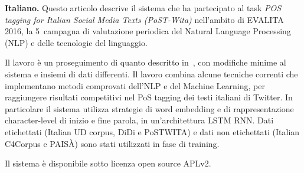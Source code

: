 \documentclass[11pt]{article}
\title{\mytitle}
\author{Egon W.~Stemle \\
    Institute for Specialised Communication and Multilingualism \\
    EURAC Research \\
    Bolzano/Bozen, Italy
    {\tt egon.stemle@eurac.edu}}
\date{}
\begin{document}
\maketitle

\begin{abstract} %
\textbf{English.}  
This article describes the system that participated in the \emph{POS tagging
for Italian Social Media Texts} (PoSTWITA) task of the 5\textsuperscript{th}
periodic evaluation campaign of Natural Language Processing (NLP) and speech
tools for the Italian language EVALITA 2016.

The work is a continuation of  with minor
modifications to the system and different data sets.  
It combines a small assertion of trending techniques, which implement matured
methods, from NLP and ML to achieve competitive results on PoS tagging of
Italian Twitter texts; in particular, the system uses word embeddings and
character-level representations of word beginnings and endings in a LSTM RNN
architecture.  
Labelled data (Italian UD corpus, DiDi and PoSTWITA) and unlabbelled data
(Italian C4Corpus and PAIS{\`A}) were used for training.

The system is available under the APLv2 open-source license.
\end{abstract}

\begin{abstract-alt}
\textrm{\bf{Italiano.}}
Questo articolo descrive il sistema che ha partecipato al task \emph{POS
tagging for Italian Social Media Texts (PoST-Wita)} nell'ambito di EVALITA
2016, la 5\textdegree~campagna di valutazione periodica del Natural Language
Processing (NLP) e delle tecnologie del linguaggio.

Il lavoro {\`e} un proseguimento di quanto descritto
in~, con modifiche minime al sistema e insiemi di
dati differenti.
Il lavoro combina alcune tecniche correnti che implementano metodi comprovati
dell'NLP e del Machine Learning, per raggiungere risultati competitivi nel PoS
tagging dei testi italiani di Twitter.
In particolare il sistema utilizza strategie di word embedding e di
rappresentazione character-level di inizio e fine parola, in un'architettura
LSTM RNN.
Dati etichettati (Italian UD corpus, DiDi e PoSTWITA) e dati non etichettati
(Italian C4Corpus e PAIS{\`A}) sono stati utilizzati in fase di training.

Il sistema {\`e} disponibile sotto licenza open source APLv2.
\end{abstract-alt}
\end{document}
